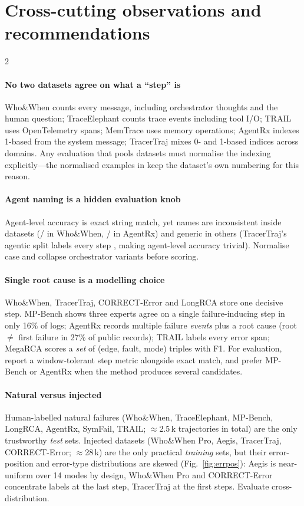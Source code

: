 \section{Cross-cutting observations and recommendations}\label{sec:reco}

\begin{multicols}{2}
\paragraph{No two datasets agree on what a ``step'' is} Who\&When counts every message, including orchestrator thoughts and the human question; TraceElephant counts trace events including tool I/O; TRAIL uses OpenTelemetry spans; MemTrace uses memory operations; AgentRx indexes 1-based from the system message; TracerTraj mixes 0- and 1-based indices across domains. Any evaluation that pools datasets must normalise the indexing explicitly---the normalised examples in  keep the dataset's own numbering for this reason.

\paragraph{Agent naming is a hidden evaluation knob} Agent-level accuracy is exact string match, yet names are inconsistent inside datasets (/ in Who\&When, / in AgentRx) and generic in others (TracerTraj's agentic split labels every step , making agent-level accuracy trivial). Normalise case and collapse orchestrator variants before scoring.

\paragraph{Single root cause is a modelling choice} Who\&When, TracerTraj, CORRECT-Error and LongRCA store one decisive step. MP-Bench shows three experts agree on a single failure-inducing step in only 16\% of logs; AgentRx records multiple failure \emph{events} plus a root cause (root $\ne$ first failure in 27\% of public records); TRAIL labels every error span; MegaRCA scores a \emph{set} of (edge, fault, mode) triples with F1. For evaluation, report a window-tolerant step metric alongside exact match, and prefer MP-Bench or AgentRx when the method produces several candidates.

\paragraph{Natural versus injected} Human-labelled natural failures (Who\&When, TraceElephant, MP-Bench, LongRCA, AgentRx, SymFail, TRAIL; $\approx$2.5\,k trajectories in total) are the only trustworthy \emph{test} sets. Injected datasets (Who\&When Pro, Aegis, TracerTraj, CORRECT-Error; $\approx$28\,k) are the only practical \emph{training} sets, but their error-position and error-type distributions are skewed (Fig.~\ref{fig:errpos}): Aegis is near-uniform over 14 modes by design, Who\&When Pro and CORRECT-Error concentrate labels at the last step, TracerTraj at the first steps. Evaluate cross-distribution.


\end{multicols}
